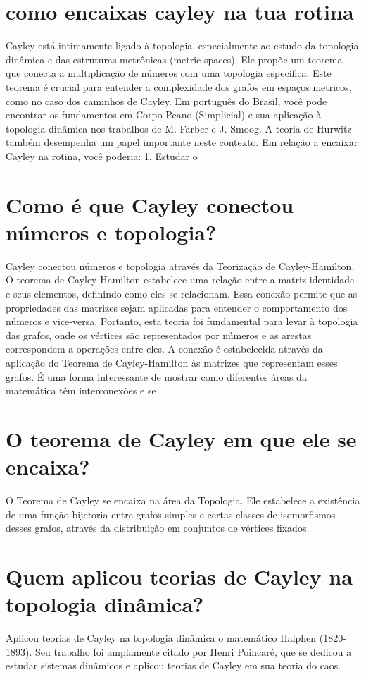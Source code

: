\documentclass[11pt,a4paper]{article}
\begin{document}
\section{como encaixas cayley na tua rotina}
Cayley está intimamente ligado à topologia, especialmente ao estudo da topologia dinâmica e das estruturas metrônicas (metric spaces). Ele propõe um teorema que conecta a multiplicação de números com uma topologia específica. Este teorema é crucial para entender a complexidade dos grafos em espaços metricos, como no caso dos caminhos de Cayley. Em português do Brasil, você pode encontrar os fundamentos em Corpo Peano (Simplicial) e sua aplicação à topologia dinâmica nos trabalhos de M. Farber e J. Smoog. A teoria de Hurwitz também desempenha um papel importante neste contexto. Em relação a encaixar Cayley na rotina, você poderia: 1. Estudar o

\section{Como é que Cayley conectou números e topologia?}
Cayley conectou números e topologia através da Teorização de Cayley-Hamilton. O teorema de Cayley-Hamilton estabelece uma relação entre a matriz identidade e seus elementos, definindo como eles se relacionam. Essa conexão permite que as propriedades das matrizes sejam aplicadas para entender o comportamento dos números e vice-versa. Portanto, esta teoria foi fundamental para levar à topologia das grafos, onde os vértices são representados por números e as arestas correspondem a operações entre eles. A conexão é estabelecida através da aplicação do Teorema de Cayley-Hamilton às matrizes que representam esses grafos. É uma forma interessante de mostrar como diferentes áreas da matemática têm interconexões e se

\section{O teorema de Cayley em que ele se encaixa?}
O Teorema de Cayley se encaixa na área da Topologia. Ele estabelece a existência de uma função bijetoria entre grafos simples e certas classes de isomorfismos desses grafos, através da distribuição em conjuntos de vértices fixados.

\section{Quem aplicou teorias de Cayley na topologia dinâmica?}
Aplicou teorias de Cayley na topologia dinâmica o matemático Halphen (1820-1893). Seu trabalho foi amplamente citado por Henri Poincaré, que se dedicou a estudar sistemas dinâmicos e aplicou teorias de Cayley em sua teoria do caos.
\end{document}
